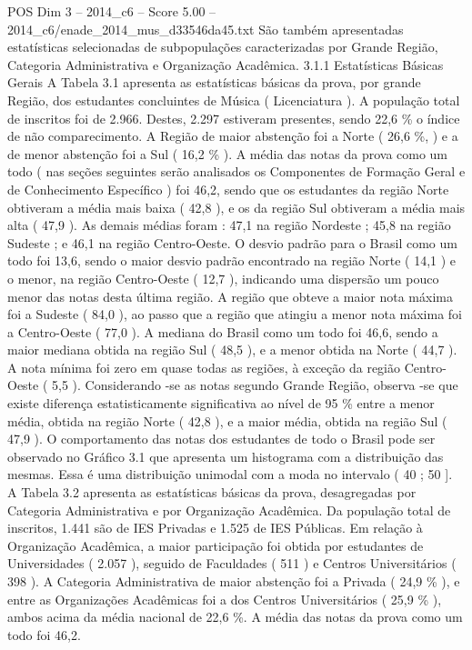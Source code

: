 \begin{textsample}{POS Dim 3 – 2014\_c6 – Score 5.00 – 2014\_c6/enade\_2014\_mus\_d33546da45.txt}
São também apresentadas estatísticas selecionadas de subpopulações caracterizadas por Grande Região, Categoria Administrativa e Organização Acadêmica. 3.1.1 Estatísticas Básicas Gerais A Tabela 3.1 apresenta as estatísticas básicas da prova, por grande Região, dos estudantes concluintes de Música ( Licenciatura ).
A população total de inscritos foi de 2.966.
Destes, 2.297 estiveram presentes, sendo 22,6 \% o índice de não comparecimento.
A Região de maior abstenção foi a Norte ( 26,6 \%, ) e a de menor abstenção foi a Sul ( 16,2 \% ).
A média das notas da prova como um todo ( nas seções seguintes serão analisados os Componentes de Formação Geral e de Conhecimento Específico ) foi 46,2, sendo que os estudantes da região Norte obtiveram a média mais baixa ( 42,8 ), e os da região Sul obtiveram a média mais alta ( 47,9 ).
As demais médias foram : 47,1 na região Nordeste ; 45,8 na região Sudeste ; e 46,1 na região Centro-Oeste.
O desvio padrão para o Brasil como um todo foi 13,6, sendo o maior desvio padrão encontrado na região Norte ( 14,1 ) e o menor, na região Centro-Oeste ( 12,7 ), indicando uma dispersão um pouco menor das notas desta última região.
A região que obteve a maior nota máxima foi a Sudeste ( 84,0 ), ao passo que a região que atingiu a menor nota máxima foi a Centro-Oeste ( 77,0 ).
A mediana do Brasil como um todo foi 46,6, sendo a maior mediana obtida na região Sul ( 48,5 ), e a menor obtida na Norte ( 44,7 ).
A nota mínima foi zero em quase todas as regiões, à exceção da região Centro-Oeste ( 5,5 ).
Considerando -se as notas segundo Grande Região, observa -se que existe diferença estatisticamente significativa ao nível de 95 \% entre a menor média, obtida na região Norte ( 42,8 ), e a maior média, obtida na região Sul ( 47,9 ).
O comportamento das notas dos estudantes de todo o Brasil pode ser observado no Gráfico 3.1 que apresenta um histograma com a distribuição das mesmas.
Essa é uma distribuição unimodal com a moda no intervalo ( 40 ; 50 ].
A Tabela 3.2 apresenta as estatísticas básicas da prova, desagregadas por Categoria Administrativa e por Organização Acadêmica.
Da população total de inscritos, 1.441 são de IES Privadas e 1.525 de IES Públicas.
Em relação à Organização Acadêmica, a maior participação foi obtida por estudantes de Universidades ( 2.057 ), seguido de Faculdades ( 511 ) e Centros Universitários ( 398 ).
A Categoria Administrativa de maior abstenção foi a Privada ( 24,9 \% ), e entre as Organizações Acadêmicas foi a dos Centros Universitários ( 25,9 \% ), ambos acima da média nacional de 22,6 \%.
A média das notas da prova como um todo foi 46,2.

\end{textsample}
